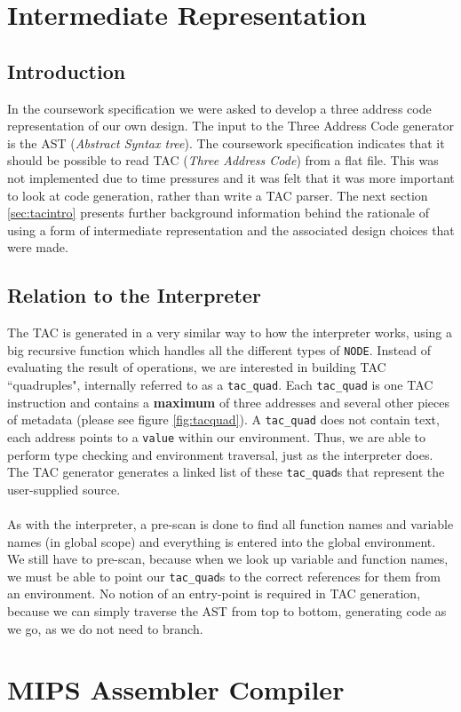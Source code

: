 \section{Intermediate Representation}

\subsection{Introduction}
In the coursework specification we were asked to develop a three address code representation of our own design. The input to the Three Address Code generator is the AST (\emph{Abstract Syntax tree}). The coursework specification indicates that it should be possible to read TAC (\emph{Three Address Code}) from a flat file. This was not implemented due to time pressures and it was felt that it was more important to look at code generation, rather than write a TAC parser. The next section \ref{sec:tacintro} presents further background information behind the rationale of using a form of intermediate representation and the associated design choices that were made.

\subsection{Relation to the Interpreter}
The TAC is generated in a very similar way to how the interpreter works, using a big recursive function which handles all the different types of \verb!NODE!. Instead of evaluating the result of operations, we are interested in building TAC ``quadruples", internally referred to as a \verb!tac_quad!. Each \verb!tac_quad! is one TAC instruction and contains a \textbf{maximum} of three addresses and several other pieces of metadata (please see figure \ref{fig:tacquad}). A \verb!tac_quad! does not contain text, each address points to a \verb!value! within our environment. Thus, we are able to perform type checking and environment traversal, just as the interpreter does. The TAC generator generates a linked list of these \verb!tac_quad!s that represent the user-supplied \mmc source.
\ \\ \ \\
As with the interpreter, a pre-scan is done to find all function names and variable names (in global scope) and everything is entered into the global environment. We still have to pre-scan, because when we look up variable and function names, we must be able to point our \verb!tac_quad!s to the correct references for them from an environment. No notion of an entry-point is required in TAC generation, because we can simply traverse the AST from top to bottom, generating code as we go, as we do not need to branch.




\section{MIPS Assembler Compiler}
\label{section:MIPS}